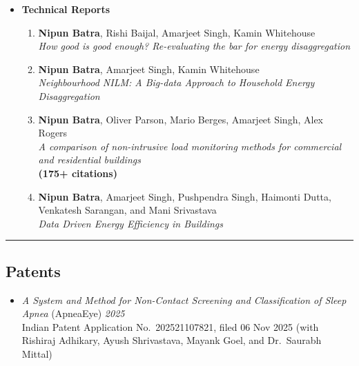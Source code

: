 \documentclass[letter,10pt]{article}
\begin{document}
\begin{itemize}
\begin{enumerate}
\item {\textbf{Nipun Batra}, Manoj Gulati, Puneet Jain, Kamin Whitehouse and Amarjeet Singh} \\ 
\textit{Bits and watts: improving
	energy disaggregation performance using power line communication modems} \\
{Buildsys 2014}


\end{enumerate}

\item[]\textbf{Technical Reports}
    \begin{enumerate}
    \item 
    {\textbf{Nipun Batra}, Rishi Baijal, Amarjeet Singh, Kamin Whitehouse}\\
    \textit{How good is good enough? Re-evaluating
	the bar for energy disaggregation}

\item {\textbf{Nipun Batra},  Amarjeet Singh, Kamin Whitehouse} \\ 
\textit{Neighbourhood NILM: A Big-data Approach to Household
	Energy Disaggregation}

\item {\textbf{Nipun Batra},  Oliver Parson, Mario Berges, Amarjeet Singh, Alex Rogers} \\ 
\textit{A comparison of non-intrusive load monitoring methods for commercial and residential buildings} \\ 
{\textbf{(175+ citations)}}

\item {\textbf{Nipun Batra},  Amarjeet Singh, Pushpendra Singh, Haimonti Dutta, Venkatesh Sarangan, and Mani Srivastava} \\
\textit{Data Driven Energy Efficiency in Buildings}
    
    \end{enumerate}
    
    
    
\end{itemize}

\ifcvshort\else
\vspace{0.5em}
\noindent\rule{\textwidth}{0.5pt}
\vspace{-0.2em}
\fi

\subsection*{\textbf{Patents}}
\vspace{-0.4em}
\begin{itemize}
\item[]{\textit{A System and Method for Non-Contact Screening and Classification of Sleep Apnea} (ApneaEye)} \hfill\textit{2025}\\
    Indian Patent Application No.\ 202521107821, filed 06 Nov 2025 (with Rishiraj Adhikary, Ayush Shrivastava, Mayank Goel, and Dr.\ Saurabh Mittal)
\end{itemize}
\end{document}
